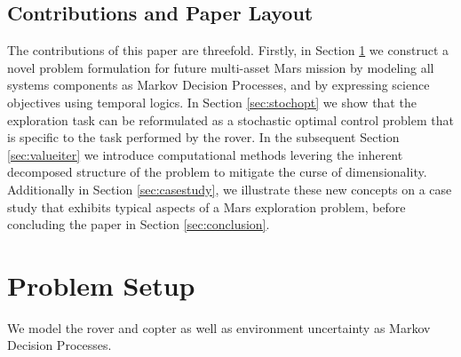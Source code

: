 \documentclass[conference]{IEEEtran}
\begin{document}
\subsection{Contributions and Paper Layout}

The contributions of this paper are threefold. Firstly, in Section \ref{sec:problem} we construct a novel problem formulation for future multi-asset Mars mission by modeling all systems components as Markov Decision Processes, and by expressing science objectives using temporal logics. In Section \ref{sec:stochopt} we show that the exploration task can be reformulated as a stochastic optimal control problem that is specific to the task performed by the rover. In the subsequent Section \ref{sec:valueiter} we introduce computational methods levering the inherent decomposed structure of the problem to mitigate the curse of dimensionality. Additionally in Section \ref{sec:casestudy}, we illustrate these new concepts on a case study that exhibits typical aspects of a Mars exploration problem, before concluding the paper in Section \ref{sec:conclusion}.


\section{Problem Setup}
\label{sec:problem}

We model the rover and copter as well as environment uncertainty as Markov Decision Processes.

\end{document}

